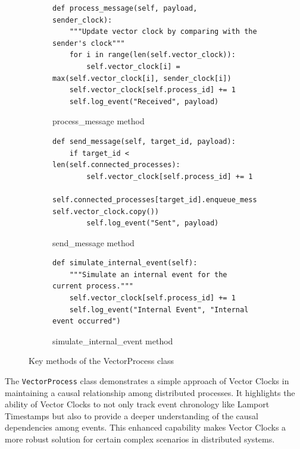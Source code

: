\documentclass{article}
\begin{document}
      \begin{figure}[h!]
        \centering
        \begin{subfigure}{0.51\textwidth}
        \begin{verbatim}
def process_message(self, payload, sender_clock):
    """Update vector clock by comparing with the sender's clock"""
    for i in range(len(self.vector_clock)):
        self.vector_clock[i] = max(self.vector_clock[i], sender_clock[i])
    self.vector_clock[self.process_id] += 1
    self.log_event("Received", payload)
        \end{verbatim}
        \caption{process\_message method}
        \label{fig:process_message}
    \end{subfigure}
    \hfill
    \begin{subfigure}{0.51\textwidth}
        \begin{verbatim}
def send_message(self, target_id, payload):
    if target_id < len(self.connected_processes):
        self.vector_clock[self.process_id] += 1
        self.connected_processes[target_id].enqueue_message(payload, self.vector_clock.copy())
        self.log_event("Sent", payload)
        \end{verbatim}
        \caption{send\_message method}
        \label{fig:send_message}
    \end{subfigure}
    \par\bigskip %
    \begin{subfigure}{0.51\textwidth}
        \begin{verbatim}
def simulate_internal_event(self):
    """Simulate an internal event for the current process."""
    self.vector_clock[self.process_id] += 1
    self.log_event("Internal Event", "Internal event occurred")
        \end{verbatim}
        \caption{simulate\_internal\_event method}
        \label{fig:simulate_internal_event}
    \end{subfigure}
    \caption{Key methods of the VectorProcess class}
    \label{fig:vector_process_methods}
\end{figure}

      The \texttt{VectorProcess} class demonstrates a simple approach of Vector Clocks in maintaining a causal relationship among distributed processes. It highlights the ability of Vector Clocks to not only track event chronology like Lamport Timestamps but also to provide a deeper understanding of the causal dependencies among events. This enhanced capability makes Vector Clocks a more robust solution for certain complex scenarios in distributed systems.
      
\end{document}
